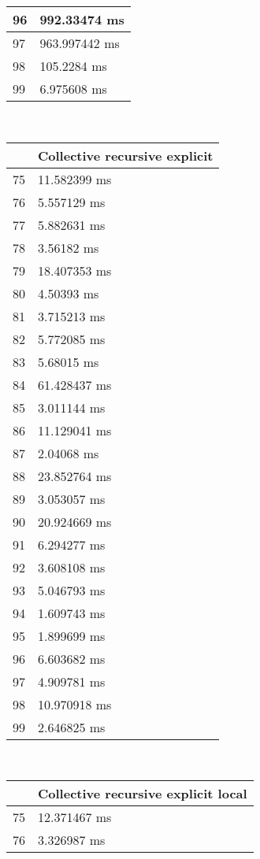 \begin{multicols}{2}
\begin{tabular}{|l|l|}
		96 & 992.33474 ms \\ \hline
		97 & 963.997442 ms \\ \hline
		98 & 105.2284 ms \\ \hline
		99 & 6.975608 ms \\ \hline
	\end{tabular}\\
	\begin{tabular}{|l|l|}
		\hline
		& Collective recursive explicit \\ \hline
		75 & 11.582399 ms \\ \hline
		76 & 5.557129 ms \\ \hline
		77 & 5.882631 ms \\ \hline
		78 & 3.56182 ms \\ \hline
		79 & 18.407353 ms \\ \hline
		80 & 4.50393 ms \\ \hline
		81 & 3.715213 ms \\ \hline
		82 & 5.772085 ms \\ \hline
		83 & 5.68015 ms \\ \hline
		84 & 61.428437 ms \\ \hline
		85 & 3.011144 ms \\ \hline
		86 & 11.129041 ms \\ \hline
		87 & 2.04068 ms \\ \hline
		88 & 23.852764 ms \\ \hline
		89 & 3.053057 ms \\ \hline
		90 & 20.924669 ms \\ \hline
		91 & 6.294277 ms \\ \hline
		92 & 3.608108 ms \\ \hline
		93 & 5.046793 ms \\ \hline
		94 & 1.609743 ms \\ \hline
		95 & 1.899699 ms \\ \hline
		96 & 6.603682 ms \\ \hline
		97 & 4.909781 ms \\ \hline
		98 & 10.970918 ms \\ \hline
		99 & 2.646825 ms \\ \hline
	\end{tabular}\\
	\begin{tabular}{|l|l|}
		\hline
		& Collective recursive explicit local \\ \hline
		75 & 12.371467 ms \\ \hline
		76 & 3.326987 ms \\ \hline

\end{tabular}
\end{multicols}
